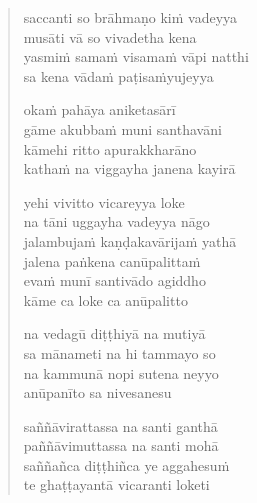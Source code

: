 \clearpage
\begin{verse}

saccanti so brāhmaṇo kiṁ vadeyya\\
musāti vā so vivadetha kena\\
yasmiṁ samaṁ visamaṁ vāpi natthi\\
sa kena vādaṁ paṭisaṁyujeyya

okaṁ pahāya aniketasārī\\
gāme akubbaṁ muni santhavāni\\
kāmehi ritto apurakkharāno\\
kathaṁ na viggayha janena kayirā

yehi vivitto vicareyya loke\\
na tāni uggayha vadeyya nāgo\\
jalambujaṁ kaṇḍakavārijaṁ yathā\\
jalena paṅkena canūpalittaṁ\\
evaṁ munī santivādo agiddho\\
kāme ca loke ca anūpalitto

na vedagū diṭṭhiyā na mutiyā\\
sa mānameti na hi tammayo so\\
na kammunā nopi sutena neyyo\\
anūpanīto sa nivesanesu

saññāvirattassa na santi ganthā\\
paññāvimuttassa na santi mohā\\
saññañca diṭṭhiñca ye aggahesuṁ\\
te ghaṭṭayantā vicaranti loketi

\end{verse}


